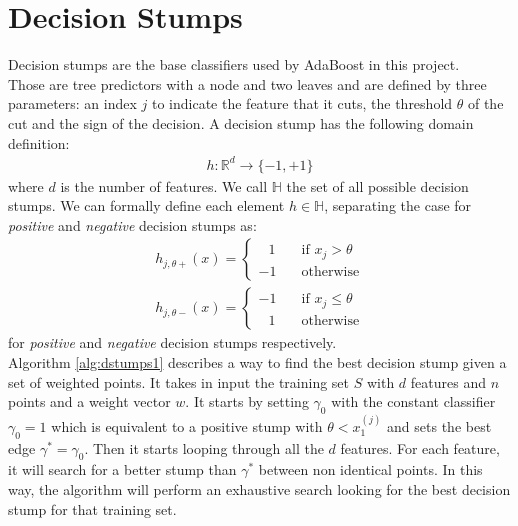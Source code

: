 
\chapter{Decision Stumps}
Decision stumps are the base classifiers used by AdaBoost in this project.\\
Those are tree predictors with a node and two leaves and are defined by three parameters: an index $j$ to indicate the feature that it cuts, the threshold $\theta$ of the cut and the sign of the decision. A decision stump has the following domain definition:
\begin{align}
\label{eq:dstumps_function}
	h:\mathbb{R}^d \to \lbrace-1, +1\rbrace
\end{align}
where $d$ is the number of features.
We call $\mathbb{H}$ the set of all  possible decision stumps. We can formally define each element $h \in \mathbb{H}$, separating the case for \textit{positive} and \textit{negative} decision stumps as:
\begin{align}
h_{j, \theta+}(x) =
\begin{cases}
\;\;\,1       & \quad \text{if } x_j > \theta\\
-1  & \quad \text{otherwise}
\end{cases}
\\
h_{j,\theta-}(x) =
\begin{cases}
-1			& \quad \text{if } x_j \leq \theta\\
\;\;\,1		& \quad \text{otherwise}
\end{cases}
\end{align}
for \textit{positive} and \textit{negative} decision stumps respectively.\\
Algorithm \ref{alg:dstumps1} describes a way to find the best decision stump given a set of weighted points. It takes in input the training set $S$ with $d$ features and $n$ points and a weight vector $w$. It starts by setting $\gamma_{0}$ with the constant classifier $\gamma_{0} = 1$ which is equivalent to a positive stump with $\theta < x_{1}^{(j)}$ and sets the best edge $\gamma^{*} = \gamma_{0}$. Then it starts looping through all the $d$ features. For each feature, it will search for a better stump than $\gamma^{*}$ between non identical points. In this way, the algorithm will perform an exhaustive search looking for the best decision stump for that training set.
